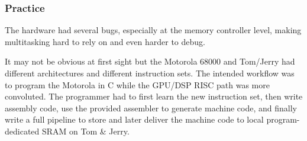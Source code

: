 \subsubsection{Practice}
The hardware had several bugs, especially at the memory controller level, making multitasking hard to rely on and even harder to debug.\\
\par 
It may not be obvious at first sight but the Motorola 68000 and Tom/Jerry had different architectures and different instruction sets. The intended workflow was to program the Motorola in C while the GPU/DSP RISC path was more convoluted. The programmer had to first learn the new instruction set, then write assembly code, use the provided assembler to generate machine code, and finally write a full pipeline to store and later deliver the machine code to local program-dedicated SRAM on Tom \& Jerry.\\
\par











